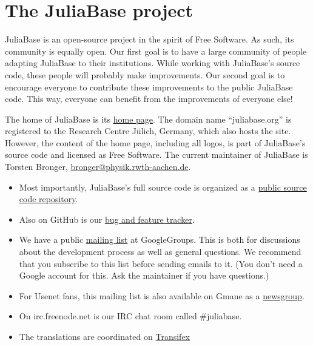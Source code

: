 \documentclass[a4paper,11pt,english]{sphinxmanual}
\begin{document}

\chapter{The JuliaBase project}
\label{project:index-0}\label{project:the-juliabase-project}\label{project::doc}
JuliaBase is an open-source project in the spirit of Free Software.  As such,
its community is equally open.  Our first goal is to have a large community of
people adapting JuliaBase to their institutions.  While working with
JuliaBase's source code, these people will probably make improvements.  Our
second goal is to encourage everyone to contribute these improvements to the
public JuliaBase code.  This way, everyone can benefit from the improvements of
everyone else!

The home of JuliaBase is its \href{http://www.juliabase.org}{home page}.  The domain name “juliabase.org” is
registered to the Research Centre Jülich, Germany, which also hosts the site.
However, the content of the home page, including all logos, is part of
JuliaBase's source code and licensed as Free Software.  The current maintainer
of JuliaBase is Torsten Bronger, \href{mailto:bronger@physik.rwth-aachen.de}{bronger@physik.rwth-aachen.de}.
\begin{itemize}
\item {} 
Most importantly, JuliaBase's full source code is organized as a \href{https://github.com/juliabase}{public
source code repository}.

\item {} 
Also on GitHub is our \href{https://github.com/juliabase/juliabase/issues}{bug and feature tracker}.

\item {} 
We have a public \href{https://groups.google.com/forum/?hl=de\#!forum/juliabase}{mailing list} at GoogleGroups.  This is both for
discussions about the development process as well as general questions.  We
recommend that you subscribe to this list before sending emails to it.  (You
don't need a Google account for this.  Ask the maintainer if you have
questions.)

\item {} 
For Usenet fans, this mailing list is also available on Gmane as a
\href{http://dir.gmane.org/gmane.comp.db.juliabase}{newsgroup}.

\item {} 
On irc.freenode.net is our IRC chat room called \#juliabase.

\item {} 
The translations are coordinated on \href{https://www.transifex.com/organization/juliabase/dashboard/juliabase}{Transifex}

\end{itemize}
\end{document}
